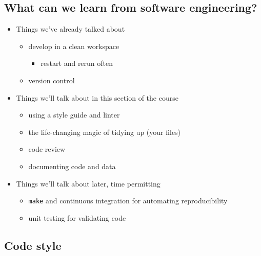 \documentclass[
]{article}
\providecommand{\tightlist}{%
  \setlength{\itemsep}{0pt}\setlength{\parskip}{0pt}}
\begin{document}
\hypertarget{what-can-we-learn-from-software-engineering}{%
\subsection{What can we learn from software engineering?}\label{what-can-we-learn-from-software-engineering}}

\begin{itemize}
\tightlist
\item
  Things we've already talked about

  \begin{itemize}
  \tightlist
  \item
    develop in a clean workspace

    \begin{itemize}
    \tightlist
    \item
      restart and rerun often
    \end{itemize}
  \item
    version control
  \end{itemize}
\item
  Things we'll talk about in this section of the course

  \begin{itemize}
  \tightlist
  \item
    using a style guide and linter
  \item
    the life-changing magic of tidying up (your files)
  \item
    code review
  \item
    documenting code and data
  \end{itemize}
\item
  Things we'll talk about later, time permitting

  \begin{itemize}
  \tightlist
  \item
    \texttt{make} and continuous integration for automating reproducibility
  \item
    unit testing for validating code
  \end{itemize}
\end{itemize}

\hypertarget{code-style}{%
\subsection{Code style}\label{code-style}}
\end{document}
